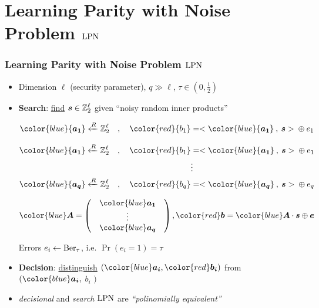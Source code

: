 \section{Learning Parity with Noise Problem $\mathrm{LPN}$}

\begin{frame}
\frametitle{Learning Parity with Noise Problem $\mathrm{LPN}$}
\begin{itemize}[<+->]
 \item Dimension $\ell$ (security parameter), $q \gg \ell$, $\tau \in \left( 0,\frac{1}{2} \right)$
 \vspace*{5pt}
 \item \textbf{Search}: \underline{find}  $ \boldsymbol{s} \in \mathbb{Z}_2^{\ell}$ given ``noisy random inner products'' \\
 \begin{overprint}
 \begin{align*}
  {\color{blue}{\vect{a_1}}} \R \zol \quad , \quad {\color{red}{b_1}} &= <{\color{blue}{\vect{a_1}}} \: , \: \vect{s}> \: \xor \: e_1 \\  
  \end{align*}

  \begin{align*}
  {\color{blue}{\vect{a_1}}} \R \zol \quad , \quad {\color{red}{b_1}} &= <{\color{blue}{\vect{a_1}}} \: , \: \vect{s}> \: \xor \: e_1 \\
   & \vdots \\
   {\color{blue}{\vect{a_q}}} \R \zol \quad, \quad  {\color{red}{b_q}} &= <{\color{blue}{\vect{a_q}}} \: , \: \vect{s}> \: \xor \: e_q \\
  \end{align*}

  \vspace*{15pt}
\[
{\color{blue} \vect{A}} = \begin{pmatrix}
            & {\color{blue}\vect{a_1}} & \\
            & \vdots  & \\ 
            & {\color{blue}\vect{a_q}} & 
           \end{pmatrix}  , {\color{red} \vect{b}} = {\color{blue} \vect{A}} \cdot \vect{s} \xor \vect{e} 
\]
 \end{overprint}
  Errors $e_i \gets \mathrm{Ber}_{\tau}$, i.e. $\Pr(e_i=1)= \tau$
\end{itemize}
\vspace{5pt}

  \begin{itemize}
    \item<5-> \textbf{Decision}: \underline{distinguish} $\left( {\color{blue}\vect{a_i}}, {\color{red}\vect{b_i}} \right)$ from {\color{blue}{uniform}} $( {\color{blue}\vect{a_i}}, $ {\color{blue} $b_i$} $)$ 
\vspace{5pt}
    \item<6-> \emph{decisional} and \emph{search} $\mathrm{LPN}$ are \emph{``polinomially equivalent''} \\ 
 \end{itemize}
\end{frame}

